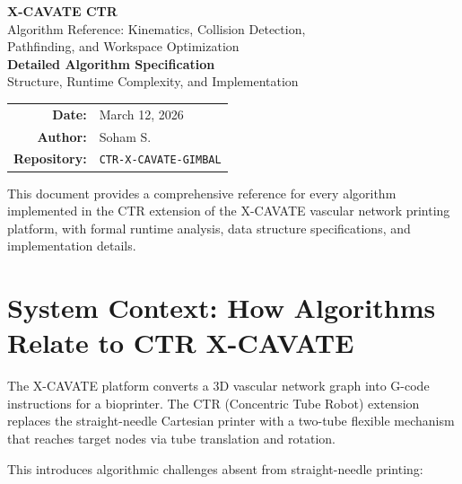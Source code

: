 \documentclass[11pt,a4paper]{article}
\begin{document}
\begin{titlepage}
\centering
\vspace*{3cm}

{\Huge\bfseries\textcolor{accentblue}{X-CAVATE CTR}}\\[0.5cm]
{\Large\textcolor{accentblue!70!black}{Algorithm Reference: Kinematics, Collision Detection,\\Pathfinding, and Workspace Optimization}}\\[2cm]

{\large\textbf{Detailed Algorithm Specification}}\\[0.5cm]
{\large Structure, Runtime Complexity, and Implementation}\\[2cm]

\begin{tabular}{rl}
\textbf{Date:} & March 12, 2026 \\
\textbf{Author:} & Soham S. \\
\textbf{Repository:} & \texttt{CTR-X-CAVATE-GIMBAL} \\
\end{tabular}

\vfill

{\small\textcolor{codegray}{This document provides a comprehensive reference for every algorithm implemented in the CTR extension of the X-CAVATE vascular network printing platform, with formal runtime analysis, data structure specifications, and implementation details.}}

\end{titlepage}

\tableofcontents
\newpage

\section{System Context: How Algorithms Relate to CTR X-CAVATE}

The X-CAVATE platform converts a 3D vascular network graph into G-code instructions for a bioprinter. The CTR (Concentric Tube Robot) extension replaces the straight-needle Cartesian printer with a two-tube flexible mechanism that reaches target nodes via tube translation and rotation.

This introduces algorithmic challenges absent from straight-needle printing:
\end{document}
